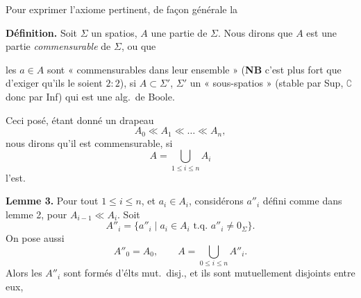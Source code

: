 \documentclass[11pt,a4paper]{article}
\begin{document}
Pour exprimer l'axiome pertinent,   de façon générale la

\textbf{Définition.} Soit $\Sigma$ un spatios,   $A$ une partie de $\Sigma$. Nous dirons que $A$ est une partie \textit{commensurable} de $\Sigma$, ou que \struck{\ill{}}

les $a \in A$ sont « commensurables dans leur ensemble » (\textbf{NB} c'est plus fort que d'exiger qu'ils le soient $2 : 2$), si $A \subset \Sigma'$, $\Sigma'$  un « sous-spatios » (stable par Sup, $\complement$ donc par Inf) qui est une alg.\ de Boole.

Ceci posé, étant donné un drapeau
\[
  A_0 \ll A_1 \ll \dots \ll A_n ,
\]
nous dirons qu'il est commensurable, si
\[
  A = \bigcup_{1 \le i \le n} A_i
\]
l'est.


\textbf{Lemme 3.} Pour tout $1 \le i \le n$, et $a_i \in A_i$, considérons $a''_i$ défini comme dans lemme 2, pour $A_{i-1} \ll A_i$. Soit
\[
  A''_i = \{ a''_i \mid a_i \in A_i \text{ t.q. } a''_i \ne 0_\Sigma \} .
\]
 On pose aussi
\[
  A''_0 = A_0 , \qquad
  A = \bigcup_{0 \le i \le n} A''_i .
\]
Alors les $A''_i$ sont formés d'élts  mut.\ disj., et ils sont mutuellement disjoints entre eux,

\end{document}
